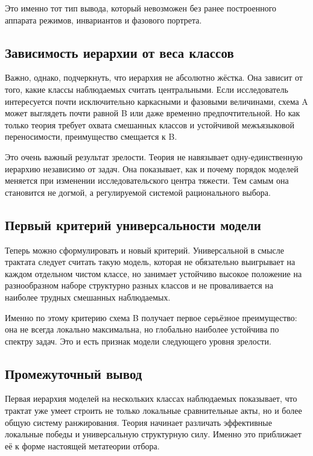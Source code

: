 \documentclass[12pt,a4paper]{article}
\begin{document}
Это именно тот тип вывода, который невозможен без ранее построенного аппарата режимов, инвариантов и фазового портрета.

\subsection{Зависимость иерархии от веса классов}

Важно, однако, подчеркнуть, что иерархия не абсолютно жёстка. Она зависит от того, какие классы наблюдаемых считать центральными. Если исследователь интересуется почти исключительно каркасными и фазовыми величинами, схема A может выглядеть почти равной B или даже временно предпочтительной. Но как только теория требует охвата смешанных классов и устойчивой межъязыковой переносимости, преимущество смещается к B.

Это очень важный результат зрелости. Теория не навязывает одну-единственную иерархию независимо от задач. Она показывает, как и почему порядок моделей меняется при изменении исследовательского центра тяжести. Тем самым она становится не догмой, а регулируемой системой рационального выбора.

\subsection{Первый критерий универсальности модели}

Теперь можно сформулировать и новый критерий. Универсальной в смысле трактата следует считать такую модель, которая не обязательно выигрывает на каждом отдельном чистом классе, но занимает устойчиво высокое положение на разнообразном наборе структурно разных классов и не проваливается на наиболее трудных смешанных наблюдаемых.

Именно по этому критерию схема B получает первое серьёзное преимущество: она не всегда локально максимальна, но глобально наиболее устойчива по спектру задач. Это и есть признак модели следующего уровня зрелости.

\subsection{Промежуточный вывод}

Первая иерархия моделей на нескольких классах наблюдаемых показывает, что трактат уже умеет строить не только локальные сравнительные акты, но и более общую систему ранжирования. Теория начинает различать эффективные локальные победы и универсальную структурную силу. Именно это приближает её к форме настоящей метатеории отбора.
\end{document}
